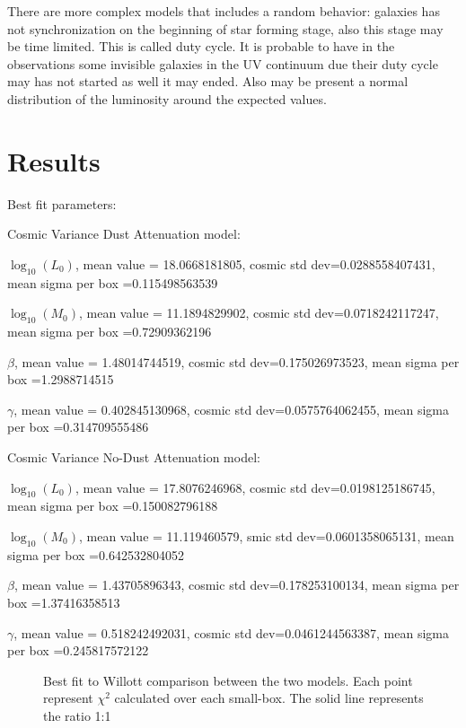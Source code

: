 \documentclass{emulateapj}
\begin{document}
There are more complex models\citep{lee09} that includes a random behavior:
galaxies has not synchronization on the beginning of star forming stage, also
this stage may be time limited. This is called duty cycle. It is probable to
have in the observations some invisible galaxies in the UV continuum due their
duty cycle may has not started as well it may ended. Also may be present a
normal distribution of the luminosity around the expected values.

\section{Results}
\label{sec:results}


Best fit parameters:





Cosmic Variance Dust Attenuation model:

$\log_{10}(L_0)$, mean value = 18.0668181805, 
cosmic std dev=0.0288558407431, 
mean sigma per box =0.115498563539

$\log_{10}(M_0)$, mean value = 11.1894829902, 
cosmic std dev=0.0718242117247, mean 
sigma per box =0.72909362196

$\beta$, mean value = 1.48014744519, 
cosmic std dev=0.175026973523, 
mean sigma per box =1.2988714515

$\gamma$, mean value = 0.402845130968, 
cosmic std dev=0.0575764062455, 
mean sigma per box =0.314709555486


\medskip




Cosmic Variance No-Dust Attenuation model:

$\log_{10}(L_0)$, mean value = 17.8076246968, 
cosmic std dev=0.0198125186745, 
mean sigma per box =0.150082796188

$\log_{10}(M_0)$, mean value = 11.119460579, 
smic std dev=0.0601358065131, 
mean sigma per box =0.642532804052

$\beta$, mean value = 1.43705896343, 
cosmic std dev=0.178253100134, 
mean sigma per box =1.37416358513

$\gamma$, mean value = 0.518242492031, 
cosmic std dev=0.0461244563387, 
mean sigma per box =0.245817572122





\begin{figure}
\caption{Best fit to Willott comparison between the two models. Each point represent $\chi^2$ 
calculated over each small-box. The solid line represents the ratio 1:1 }
\label{fig:OD1_chi2_comparison}
\end{figure}
\end{document}
